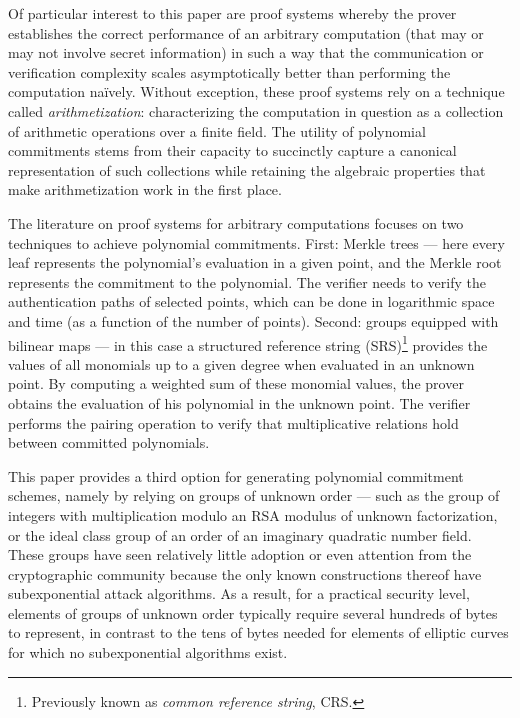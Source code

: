 Of particular interest to this paper are proof systems whereby the prover establishes the correct performance of an arbitrary computation (that may or may not involve secret information) in such a way that the communication or verification complexity scales asymptotically better than performing the computation naïvely. Without exception, these proof systems rely on a technique called \emph{arithmetization}: characterizing the computation in question as a collection of arithmetic operations over a finite field. The utility of polynomial commitments stems from their capacity to succinctly capture a canonical representation of such collections while retaining the algebraic properties that make arithmetization work in the first place.

The literature on proof systems for arbitrary computations focuses on two techniques to achieve polynomial commitments. First: Merkle trees --- here every leaf represents the polynomial's evaluation in a given point, and the Merkle root represents the commitment to the polynomial. The verifier needs to verify the authentication paths of selected points, which can be done in logarithmic space and time (as a function of the number of points). Second: groups equipped with bilinear maps --- in this case a structured reference string (SRS)\footnote{Previously known as \emph{common reference string}, CRS.} provides the values of all monomials up to a given degree when evaluated in an unknown point. By computing a weighted sum of these monomial values, the prover obtains the evaluation of his polynomial in the unknown point. The verifier performs the pairing operation to verify that multiplicative relations hold between committed polynomials.

This paper provides a third option for generating polynomial commitment schemes, namely by relying on groups of unknown order --- such as the group of integers with multiplication modulo an RSA modulus of unknown factorization, or the ideal class group of an order of an imaginary quadratic number field. These groups have seen relatively little adoption or even attention from the cryptographic community because the only known constructions thereof have subexponential attack algorithms. As a result, for a practical security level, elements of groups of unknown order typically require several hundreds of bytes to represent, in contrast to the tens of bytes needed for elements of elliptic curves for which no subexponential algorithms exist. 

